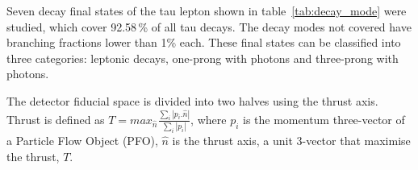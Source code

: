 \documentclass[a4paper,11pt]{article}
\begin{document}
Seven decay final states of the tau lepton shown in table~\ref{tab:decay_mode} were studied, which cover 92.58\,\% of all tau decays. The decay modes not covered have branching fractions lower than 1\% each. These final states can be classified into three categories: leptonic decays, one-prong with photons and three-prong with photons. 


The detector fiducial space is divided into two halves using the thrust axis. Thrust is defined as 
$T = max_{\hat{n}} \frac {\sum_i \left| p_i . \hat{n} \right|}{\sum_i \left| p_i \right|}$, where  $p_i$ is the momentum three-vector of a Particle Flow Object (PFO), $\hat{n}$ is the thrust axis, a unit 3-vector that maximise the thrust, $T$.

\end{document}
